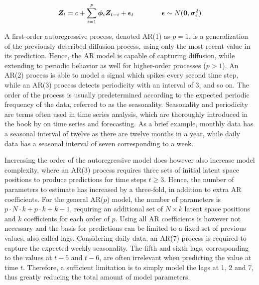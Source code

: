     \begin{equation}\label{eq:ar-model}
        \bm{Z}_t = c+\sum_{i=1}^p \bm{\phi}_i \bm{Z}_{t-i} + \bm{\epsilon}_t \qquad\qquad \bm{\epsilon} \sim N(\bm{0},\bm{\sigma}_\epsilon^2)
    \end{equation}
    
    A first-order autoregressive process, denoted AR(1) as $p=1$, is a generalization of the previously described diffusion process, using only the most recent value in its prediction. Hence, the AR model is capable of capturing diffusion, while extending to periodic behavior as well for higher-order processes ($p>1$). 
    An AR(2) process is able to model a signal which spikes every second time step, while an AR(3) process detects periodicity with an interval of 3, and so on. 
    The order of the process is usually predetermined according to the expected periodic frequency of the data, referred to as the seasonality.
    Seasonality and periodicity are terms often used in time series analysis, which are thoroughly introduced in the book \cite{brockwell2016introduction} by \citeauthor{brockwell2016introduction} on time series and forecasting.
    As a brief example, monthly data has a seasonal interval of twelve as there are twelve months in a year, while daily data has a seasonal interval of seven corresponding to a week.
    
    Increasing the order of the autoregressive model does however also increase model complexity, where an AR(3) process requires three sets of initial latent space positions to produce predictions for time steps $t\geq3$. Hence, the number of parameters to estimate has increased by a three-fold, in addition to extra AR coefficients. For the general AR($p$) model, the number of parameters is $p\cdot N\cdot k + p\cdot k + k + 1$, requiring an additional set of $N\times k$ latent space positions and $k$ coefficients for each order of $p$.
    Using all AR coefficients is however not necessary and the basis for predictions can be limited to a fixed set of previous values, also called lags. Considering daily data, an AR(7) process is required to capture the expected weekly seasonality. The fifth and sixth lags, corresponding to the values at $t-5$ and $t-6$, are often irrelevant when predicting the value at time $t$. Therefore, a sufficient limitation is to simply model the lags at 1, 2 and 7, thus greatly reducing the total amount of model parameters.
    
